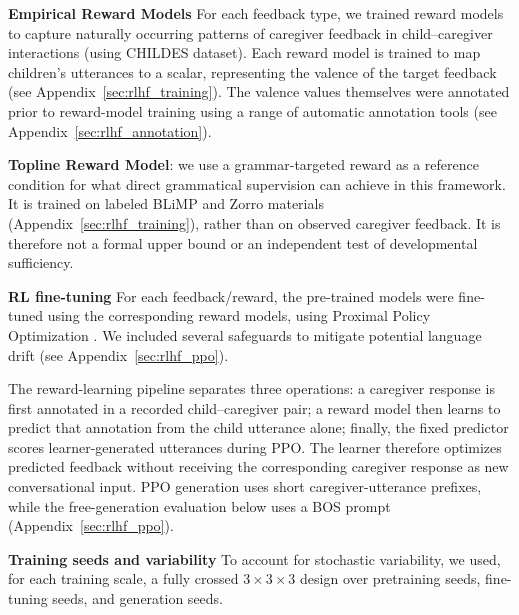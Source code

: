 \noindent \textbf{Empirical Reward Models} For each feedback type, we trained reward models to capture naturally occurring patterns of caregiver feedback in child--caregiver interactions (using CHILDES dataset). Each reward model is trained to map children's utterances to a scalar, representing the valence of the target feedback (see Appendix~\ref{sec:rlhf_training}). %
The valence values themselves were annotated prior to reward-model training using a range of automatic annotation tools (see Appendix~\ref{sec:rlhf_annotation}).

\noindent \textbf{Topline Reward Model}: we use a grammar-targeted reward as a reference condition for what direct grammatical supervision can achieve in this framework. It is trained on labeled BLiMP and Zorro materials (Appendix~\ref{sec:rlhf_training}), rather than on observed caregiver feedback. It is therefore not a formal upper bound or an independent test of developmental sufficiency.

\noindent \textbf{RL fine-tuning} For each feedback/reward, the pre-trained models were fine-tuned using the corresponding reward models, using Proximal Policy Optimization \citep[PPO;][]{schulman_proximal_2017}. We included several safeguards to mitigate potential language drift (see Appendix~\ref{sec:rlhf_ppo}).

The reward-learning pipeline separates three operations: a caregiver response is first annotated in a recorded child--caregiver pair; a reward model then learns to predict that annotation from the child utterance alone; finally, the fixed predictor scores learner-generated utterances during PPO. The learner therefore optimizes predicted feedback without receiving the corresponding caregiver response as new conversational input. PPO generation uses short caregiver-utterance prefixes, while the free-generation evaluation below uses a BOS prompt (Appendix~\ref{sec:rlhf_ppo}).

\noindent \textbf{Training seeds and variability} To account for stochastic variability, we used, for each training scale, a fully crossed $3 \times 3 \times 3$ design over pretraining seeds, fine-tuning seeds, and generation seeds.

